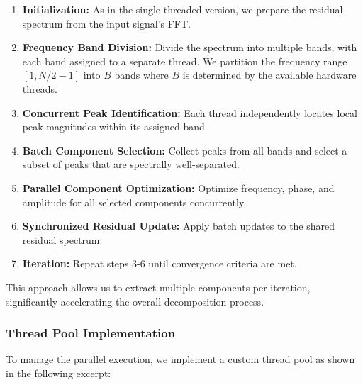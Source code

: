 \documentclass[11pt,twoside]{report}
\numberwithin{thm}{section}
\numberwithin{equation}{section}
\begin{document}
\begin{enumerate}
    \item \textbf{Initialization:} As in the single-threaded version, we prepare the residual spectrum from the input signal's FFT.
    
    \item \textbf{Frequency Band Division:} Divide the spectrum into multiple bands, with each band assigned to a separate thread. We partition the frequency range $[1, N/2-1]$ into $B$ bands where $B$ is determined by the available hardware threads.
    
    \item \textbf{Concurrent Peak Identification:} Each thread independently locates local peak magnitudes within its assigned band.
    
    \item \textbf{Batch Component Selection:} Collect peaks from all bands and select a subset of peaks that are spectrally well-separated.
    
    \item \textbf{Parallel Component Optimization:} Optimize frequency, phase, and amplitude for all selected components concurrently.
    
    \item \textbf{Synchronized Residual Update:} Apply batch updates to the shared residual spectrum.
    
    \item \textbf{Iteration:} Repeat steps 3-6 until convergence criteria are met.
\end{enumerate}

This approach allows us to extract multiple components per iteration, significantly accelerating the overall decomposition process.
\newpage %
\subsubsection{Thread Pool Implementation}

To manage the parallel execution, we implement a custom thread pool as shown in the following excerpt:
\end{document}
